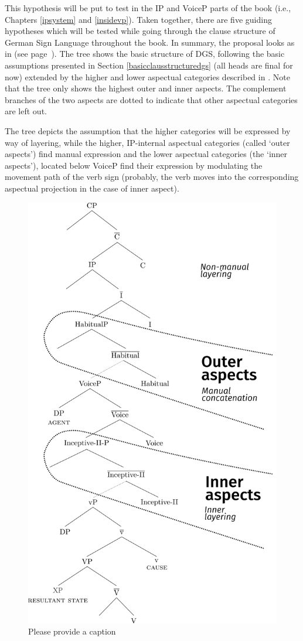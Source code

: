 \noindent This hypothesis will be put to test in the IP and VoiceP parts of the book (i.e., Chapters \ref{ipsystem} and \ref{insidevp}). Taken together, there are five guiding hypotheses which will be tested while going through the clause structure of German Sign Language throughout the book. In summary, the proposal looks as in  (see page~\pageref{treeovervies}). The tree shows the basic structure of DGS, following the basic assumptions presented in Section \ref{basicclausstructuredgs} (all heads are final for now) extended by the higher and lower aspectual categories described in \citet{cinque1999adverbs, cinque2006restructuring}. Note that the tree only shows the highest outer and inner aspects. The complement branches of the two aspects are dotted to indicate that other aspectual categories are left out.




The tree depicts the assumption that the higher categories will be expressed by way of layering, while the higher, IP-internal aspectual categories (called `outer aspects') find manual expression and the lower aspectual categories (the `inner aspects'), located below VoiceP find their expression by modulating the movement path of the verb sign (probably, the verb moves into the corresponding aspectual projection in the case of inner aspect). 

\begin{figure}
\caption{\color{red}Please provide a caption\label{treeovervies}}
            \includegraphics[width=0.7\linewidth]{treesw.jpg}
\end{figure}
